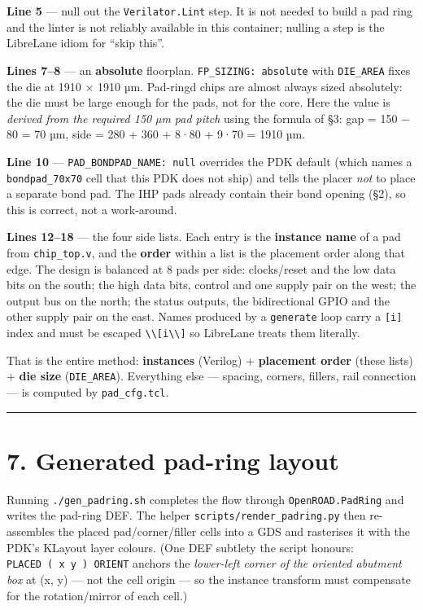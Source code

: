 \documentclass[
  11pt,
  a4paper,
]{article}
\begin{document}
\textbf{Line 5} --- null out the \texttt{Verilator.Lint} step. It is not
needed to build a pad ring and the linter is not reliably available in
this container; nulling a step is the LibreLane idiom for ``skip this''.

\textbf{Lines 7--8} --- an \textbf{absolute} floorplan.
\texttt{FP\_SIZING:\ absolute} with \texttt{DIE\_AREA} fixes the die at
1910 × 1910 µm. Pad-ringd chips are almost always sized absolutely: the
die must be large enough for the pads, not for the core. Here the value
is \emph{derived from the required 150 µm pad pitch} using the formula
of §3: gap = 150 − 80 = 70 µm, side = 280 + 360 + 8·80 + 9·70 = 1910 µm.

\textbf{Line 10} --- \texttt{PAD\_BONDPAD\_NAME:\ null} overrides the
PDK default (which names a \texttt{bondpad\_70x70} cell that this PDK
does not ship) and tells the placer \emph{not} to place a separate bond
pad. The IHP pads already contain their bond opening (§2), so this is
correct, not a work-around.

\textbf{Lines 12--18} --- the four side lists. Each entry is the
\textbf{instance name} of a pad from \texttt{chip\_top.v}, and the
\textbf{order} within a list is the placement order along that edge. The
design is balanced at 8 pads per side: clocks/reset and the low data
bits on the south; the high data bits, control and one supply pair on
the west; the output bus on the north; the status outputs, the
bidirectional GPIO and the other supply pair on the east. Names produced
by a \texttt{generate} loop carry a \texttt{{[}i{]}} index and must be
escaped
\texttt{\textbackslash{}\textbackslash{}{[}i\textbackslash{}\textbackslash{}{]}}
so LibreLane treats them literally.

That is the entire method: \textbf{instances} (Verilog) +
\textbf{placement order} (these lists) + \textbf{die size}
(\texttt{DIE\_AREA}). Everything else --- spacing, corners, fillers,
rail connection --- is computed by \texttt{pad\_cfg.tcl}.

\begin{center}\rule{0.5\linewidth}{0.5pt}\end{center}

\hypertarget{generated-pad-ring-layout}{%
\section{7. Generated pad-ring layout}\label{generated-pad-ring-layout}}

Running \texttt{./gen\_padring.sh} completes the flow through
\texttt{OpenROAD.PadRing} and writes the pad-ring DEF. The helper
\texttt{scripts/render\_padring.py} then re-assembles the placed
pad/corner/filler cells into a GDS and rasterises it with the PDK's
KLayout layer colours. (One DEF subtlety the script honours:
\texttt{PLACED\ (\ x\ y\ )\ ORIENT} anchors the \emph{lower-left corner
of the oriented abutment box} at (x, y) --- not the cell origin --- so
the instance transform must compensate for the rotation/mirror of each
cell.)
\end{document}
